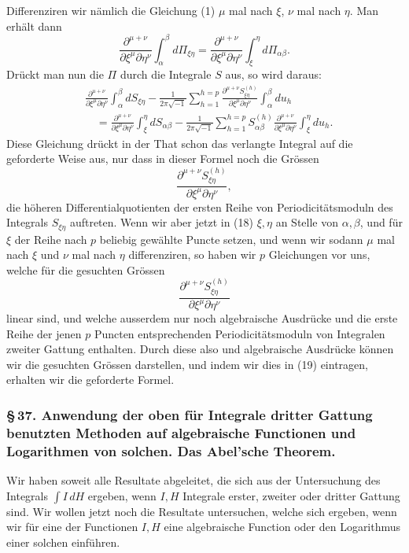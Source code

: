 \documentclass[10pt]{article}
\begin{document}
Differenziren wir nämlich die Gleichung (1) \(\mu\) mal nach \(\xi\), \(\nu\) mal nach \(\eta\). Man erhält dann
\[
\frac{\partial^{\mu+\nu}}{\partial\xi^\mu\partial\eta^\nu}\int_{\alpha}^{\beta}d\Pi_{\xi\eta}
=
\frac{\partial^{\mu+\nu}}{\partial\xi^\mu\partial\eta^\nu}\int_{\xi}^{\eta}d\Pi_{\alpha\beta}.
\]
Drückt man nun die \(\Pi\) durch die Integrale \(S\) aus, so wird daraus:
\[
\tag{19}
\begin{aligned}
&\frac{\partial^{\mu+\nu}}{\partial\xi^\mu\partial\eta^\nu}\int_{\alpha}^{\beta}dS_{\xi\eta}
-\frac{1}{2\pi\sqrt{-1}}\sum_{h=1}^{h=p}
\frac{\partial^{\mu+\nu}S_{\xi\eta}^{(h)}}{\partial\xi^\mu\partial\eta^\nu}\int_{\alpha}^{\beta}du_h\\
&\quad=\frac{\partial^{\mu+\nu}}{\partial\xi^\mu\partial\eta^\nu}\int_{\xi}^{\eta}dS_{\alpha\beta}
-\frac{1}{2\pi\sqrt{-1}}\sum_{h=1}^{h=p}S_{\alpha\beta}^{(h)}
\frac{\partial^{\mu+\nu}}{\partial\xi^\mu\partial\eta^\nu}\int_{\xi}^{\eta}du_h.
\end{aligned}
\]
Diese Gleichung drückt in der That schon das verlangte Integral auf die geforderte Weise aus, nur dass in dieser Formel noch die Grössen
\[
\frac{\partial^{\mu+\nu}S_{\xi\eta}^{(h)}}{\partial\xi^\mu\partial\eta^\nu},
\]
die höheren Differentialquotienten der ersten Reihe von Periodicitätsmoduln des Integrals \(S_{\xi\eta}\) auftreten. Wenn wir aber jetzt in (18) \(\xi,\eta\) an Stelle von \(\alpha,\beta\), und für \(\xi\) der Reihe nach \(p\) beliebig gewählte Puncte setzen, und wenn wir sodann \(\mu\) mal nach \(\xi\) und \(\nu\) mal nach \(\eta\) differenziren, so haben wir \(p\) Gleichungen vor uns, welche für die gesuchten Grössen
\[
\frac{\partial^{\mu+\nu}S_{\xi\eta}^{(h)}}{\partial\xi^\mu\partial\eta^\nu}
\]
linear sind, und welche ausserdem nur noch algebraische Ausdrücke und die erste Reihe der jenen \(p\) Puncten entsprechenden Periodicitätsmoduln von Integralen zweiter Gattung enthalten. Durch diese also und algebraische Ausdrücke können wir die gesuchten Grössen darstellen, und indem wir dies in (19) eintragen, erhalten wir die geforderte Formel.

\subsubsection*{\S\,37. Anwendung der oben für Integrale dritter Gattung benutzten Methoden auf algebraische Functionen und Logarithmen von solchen. Das Abel'sche Theorem.}

Wir haben soweit alle Resultate abgeleitet, die sich aus der Untersuchung des Integrals \(\int I\,dH\) ergeben, wenn \(I,H\) Integrale erster, zweiter oder dritter Gattung sind. Wir wollen jetzt noch die Resultate untersuchen, welche sich ergeben, wenn wir für eine der Functionen \(I,H\) eine algebraische Function oder den Logarithmus einer solchen einführen.
\end{document}
